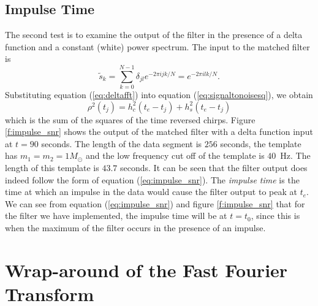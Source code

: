\subsection{Impulse Time}
\label{ss:impulsetime}

The second test is to examine the output of the filter in the presence of a
delta function and a constant (white) power spectrum. The input to the matched
filter is
\begin{equation}
\tilde{s}_k = \sum_{k=0}^{N-1} \delta_{jl} e^{-2\pi ijk/N} = e^{-2\pi ilk/N}.
\label{eq:deltafft}
\end{equation}
Substituting equation (\ref{eq:deltafft}) into equation
(\ref{eq:signaltonoisesq}), we obtain
\begin{equation}
\rho^2(t_j) = h_c^2(t_e - t_j) + h_s^2(t_e - t_j)
\label{eq:impulse_snr}
\end{equation}
which is the sum of the squares of the time reversed chirps.  Figure
\ref{f:impulse_snr} shows the output of the matched filter with a delta
function input at $t=90$ seconds. The length of the data segment is $256$
seconds, the template has $m_1 = m_2 = 1 M_\odot$ and the low frequency cut
off of the template is $40$~Hz. The length of this template is $43.7$ seconds.
It can be seen that the filter output does indeed follow the form of equation
(\ref{eq:impulse_snr}).  The \emph{impulse time} is the time at which an
impulse in the data would cause the filter output to peak at
$t_e$. We can see from equation (\ref{eq:impulse_snr}) and figure
\ref{f:impulse_snr} that for the filter we have implemented, the impulse time
will be at $t = t_0$, since this is when the maximum of the filter occurs in
the presence of an impulse.

\section{Wrap-around of the Fast Fourier Transform}
\label{s:wraparound}

